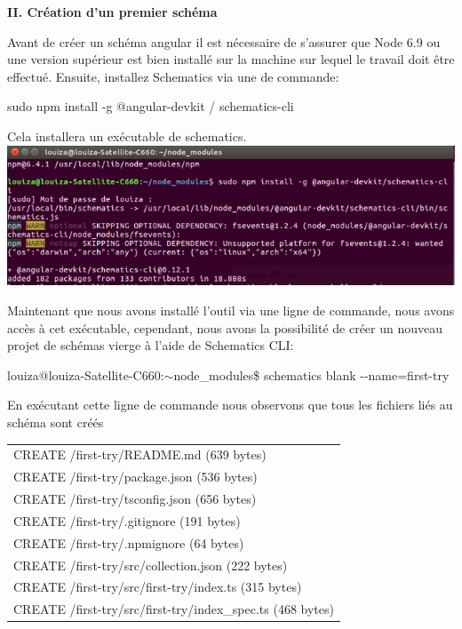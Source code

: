 \documentclass[12pt,french]{article}
\begin{document}
	\textbf{II. Création d'un premier schéma}\newline
	
	Avant de créer un schéma angular il est nécessaire de s'assurer que Node 6.9 ou une version supérieur est bien installé sur la machine sur lequel le travail doit être effectué. 
	Ensuite, installez Schematics via une de commande:
\newline
	
	\qquad sudo npm install -g @angular-devkit / schematics-cli \newline
	
	Cela installera un exécutable de schematics.\newline
	\\
	\includegraphics[scale=0.65]{1.jpg}
	
	Maintenant que nous avons installé l'outil via une ligne de commande, nous avons accès à cet exécutable, cependant, nous avons la possibilité de créer un nouveau projet de schémas vierge à l'aide de Schematics CLI:\newline
	
	\qquad louiza@louiza-Satellite-C660:$\sim$node\_modules\$ schematics blank \--\--name=first-try\newline
	
	En exécutant cette ligne de commande nous observons que tous les fichiers liés au schéma sont créés\newline
	
	\begin{tabular}{l}
		\qquad CREATE /first-try/README.md (639 bytes)\\
		\qquad CREATE /first-try/package.json (536 bytes)\\
		\qquad CREATE /first-try/tsconfig.json (656 bytes)\\
		\qquad CREATE /first-try/.gitignore (191 bytes)\\
		\qquad CREATE /first-try/.npmignore (64 bytes)\\
		\qquad CREATE /first-try/src/collection.json (222 bytes)\\
		\qquad CREATE /first-try/src/first-try/index.ts (315 bytes)\\
		\qquad CREATE /first-try/src/first-try/index\_spec.ts (468 bytes)
	\end{tabular}\break
\end{document}
